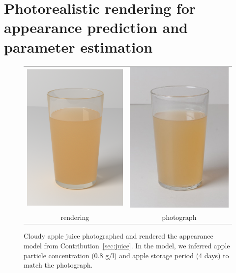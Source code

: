 \section{Photorealistic rendering for appearance prediction and parameter estimation}
\label{sec:definingphoto}
\begin{figure}[t]
\centering
\begin{tabular}{@{}c@{}c@{}}
	 \includegraphics[width=0.4\columnwidth]{figures/teaser_render.png} &
	 \includegraphics[width=0.4\columnwidth]{figures/ref_img.jpg}  \\
	rendering & photograph \\
\end{tabular}
\caption{Cloudy apple juice photographed and rendered the appearance model from Contribution~\ref{sec:juice}. In the model, we inferred apple particle concentration (0.8 g/l) and apple storage period (4 days) to match the photograph.} %
\label{fig:juicecomparison}
\end{figure}

